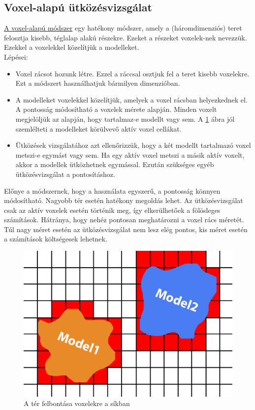 \subsection{Voxel-alapú ütközésvizsgálat}
\href{https://www.researchgate.net/publication/314816140_A_voxel-based_parallel_collision_detection_algorithm}{A voxel-alapú módszer} \cite{voxel} egy hatékony módszer, amely a (háromdimenziós) teret felosztja kisebb, téglalap alakú részekre. Ezeket a részeket voxelek-nek nevezzük.
Ezekkel a voxelekkel közelítjük a modelleket.
\\
Lépései:
\begin{itemize}
\item Voxel rácsot hozunk létre. Ezzel a ráccsal osztjuk fel a teret kisebb voxelekre. Ezt a módszert használhatjuk bármilyen dimenzióban.

\item A modelleket voxelekkel közelítjük, amelyek a voxel rácsban helyezkednek el. A pontosság módosítható a voxelek mérete alapján. Minden voxelt megjelöljük az alapján, hogy tartalmaz-e modellt vagy sem. A \ref{fig:con_3} ábra jól szemlélteti a modelleket körülvevő aktív voxel cellákat.

\item Ütközések vizsgálatához azt ellenőrizzük, hogy a két modellt tartalmazó voxel metszi-e egymást vagy sem. Ha egy aktív voxel metszi a másik aktív voxelt, akkor a modellek ütközhetnek egymással. Ezután szükséges egyéb ütközésvizsgálat a pontosításhoz.
\end{itemize}
Előnye a módszernek, hogy a használata egyszerű, a pontosság könnyen módosítható. Nagyobb tér esetén hatékony megoldás lehet. Az ütközésvizsgálat csak az aktív voxelek esetén történik meg, így elkerülhetőek a fölösleges számítások. Hátránya, hogy nehéz pontosan meghatározni a voxel rács méretét. Túl nagy méret esetén az ütközésvizsgálat nem lesz elég pontos, kis méret esetén a számítások költségesek lehetnek.
\begin{figure}[h]
	\centering
	\includegraphics[width=13truecm, height=7.5truecm]{images/con3.png}
	\caption{A tér felbontása voxelekre a síkban}
	\label{fig:con_3}
\end{figure}

